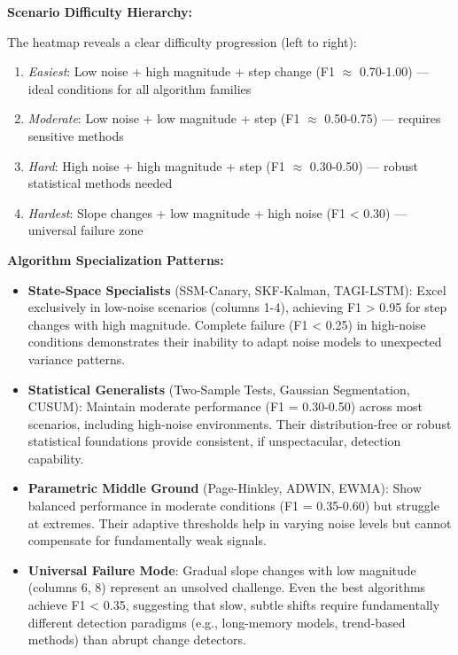 \textbf{Scenario Difficulty Hierarchy:}

The heatmap reveals a clear difficulty progression (left to right):
\begin{enumerate}
    \item \textit{Easiest}: Low noise + high magnitude + step change (F1 $\approx$ 0.70-1.00) — ideal conditions for all algorithm families
    \item \textit{Moderate}: Low noise + low magnitude + step (F1 $\approx$ 0.50-0.75) — requires sensitive methods
    \item \textit{Hard}: High noise + high magnitude + step (F1 $\approx$ 0.30-0.50) — robust statistical methods needed
    \item \textit{Hardest}: Slope changes + low magnitude + high noise (F1 < 0.30) — universal failure zone
\end{enumerate}

\textbf{Algorithm Specialization Patterns:}

\begin{itemize}
    \item \textbf{State-Space Specialists} (SSM-Canary, SKF-Kalman, TAGI-LSTM): Excel exclusively in low-noise scenarios (columns 1-4), achieving F1 > 0.95 for step changes with high magnitude. Complete failure (F1 < 0.25) in high-noise conditions demonstrates their inability to adapt noise models to unexpected variance patterns.
    
    \item \textbf{Statistical Generalists} (Two-Sample Tests, Gaussian Segmentation, CUSUM): Maintain moderate performance (F1 = 0.30-0.50) across most scenarios, including high-noise environments. Their distribution-free or robust statistical foundations provide consistent, if unspectacular, detection capability.
    
    \item \textbf{Parametric Middle Ground} (Page-Hinkley, ADWIN, EWMA): Show balanced performance in moderate conditions (F1 = 0.35-0.60) but struggle at extremes. Their adaptive thresholds help in varying noise levels but cannot compensate for fundamentally weak signals.
    
    \item \textbf{Universal Failure Mode}: Gradual slope changes with low magnitude (columns 6, 8) represent an unsolved challenge. Even the best algorithms achieve F1 < 0.35, suggesting that slow, subtle shifts require fundamentally different detection paradigms (e.g., long-memory models, trend-based methods) than abrupt change detectors.
\end{itemize}

